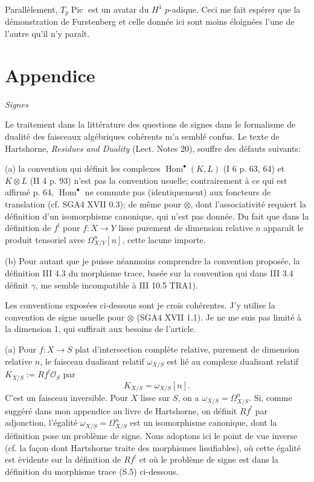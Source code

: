 \documentclass[11pt,leqno]{article}
\DeclareMathOperator{\Pic}{Pic}
\DeclareMathOperator{\Hom}{Hom}
\newcommand{\OO}{\mathcal O}
\begin{document}
Parallèlement, $T_p\Pic$ est un avatar du $H^1$ $p$-adique. Ceci me fait espérer que la démonstration de Furstenberg et celle donnée ici sont moins éloignées l'une de l'autre qu'il n'y paraît.

\section*{Appendice}
{\large\itshape Signes}\par
\medskip

Le traitement dans la littérature des questions de signes dans le formalisme de dualité des faisceaux algébriques cohérents m'a semblé confus. Le texte de Hartshorne, \emph{Residues and Duality} (Lect. Notes 20), souffre des défauts suivants:

\noindent (a) la convention qui définit les complexes $\Hom^{\bullet}(K,L)$ (I 6 p. 63, 64) et $K\otimes L$ (II 4 p. 93) n'est pas la convention usuelle; contrairement à ce qui est affirmé p. 64, $\Hom^{\bullet}$ ne commute pas (identiquement) aux foncteurs de translation (cf. SGA4 XVII 0.3); de même pour $\otimes$, dont l'associativité requiert la définition d'un isomorphisme canonique, qui n'est pas donnée. Du fait que dans la définition de $f^!$ pour $f:X\to Y$ lisse purement de dimension relative $n$ apparaît le produit tensoriel avec $\Omega^n_{X/Y}[n]$, cette lacune importe.

\noindent (b) Pour autant que je puisse néanmoins comprendre la convention proposée, la définition III 4.3 du morphisme trace, basée sur la convention qui dans III 3.4 définit $\gamma$, me semble incompatible à III 10.5 TRA1).

Les conventions exposées ci-dessous sont je crois cohérentes. J'y utilise la convention de signe usuelle pour $\otimes$ (SGA4 XVII 1.1). Je ne me suis pas limité à la dimension 1, qui suffirait aux besoins de l'article.

\noindent (a) Pour $f:X\to S$ plat d'intersection complète relative, purement de dimension relative $n$, le faisceau dualisant relatif $\omega_{X/S}$ est lié au complexe dualisant relatif $K_{X/S}:=Rf^!\OO_S$ par
\begin{equation}
        K_{X/S}=\omega_{X/S}[n]. \tag{S.1}
\end{equation}
C'est un faisceau inversible. Pour $X$ lisse sur $S$, on a $\omega_{X/S}=\Omega^n_{X/S}$. Si, comme suggéré dans mon appendice au livre de Hartshorne, on définit $Rf^!$ par adjonction, l'égalité $\omega_{X/S}=\Omega^n_{X/S}$ est un isomorphisme canonique, dont la définition pose un problème de signe. Nous adoptons ici le point de vue inverse (cf. la façon dont Hartshorne traite des morphismes lissifiables), où cette égalité est évidente sur la définition de $Rf^!$ et où le problème de signe est dans la définition du morphisme trace (S.5) ci-dessous.
\end{document}
